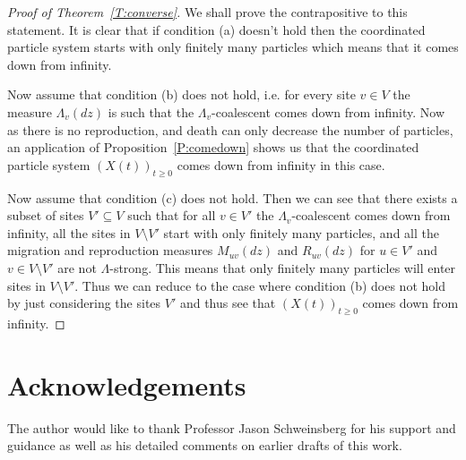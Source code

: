 \documentclass[11pt]{article}
\theoremstyle{definition}
\newcommand{\thmref}[1]{Theorem~\ref{T:#1}}
\newcommand{\propref}[1]{Proposition~\ref{P:#1}}
\begin{document}
\begin{proof}[Proof of \thmref{converse}]
    We shall prove the contrapositive to this statement. It is clear that if condition (a) doesn't hold then the coordinated particle system starts with only finitely many particles which means that it comes down from infinity. 
    \medskip
    
    \noindent Now assume that condition (b) does not hold, i.e. for every site $v \in V$ the measure $\Lambda_v(dz)$ is such that the $\Lambda_v$-coalescent comes down from infinity. Now as there is no reproduction, and death can only decrease the number of particles, an application of \propref{comedown} shows us that the coordinated particle system $(X(t))_{t \geq 0}$ comes down from infinity in this case. 
    \medskip
    
    \noindent Now assume that condition (c) does not hold. Then we can see that there exists a subset of sites $V' \subseteq V$ such that for all $v \in V'$ the $\Lambda_v$-coalescent comes down from infinity, all the sites in $V \setminus V'$ start with only finitely many particles, and all the migration and reproduction measures $M_{uv}(dz)$ and $R_{uv}(dz)$ for $u \in V'$ and $v \in V\setminus V'$ are not $\Lambda$-strong. This means that only finitely many particles will enter sites in $V \setminus V'$. Thus we can reduce to the case where condition (b) does not hold by just considering the sites $V'$ and thus see that $(X(t))_{t \geq 0}$ comes down from infinity.
\end{proof}

\section*{Acknowledgements}

The author would like to thank Professor Jason Schweinsberg for his support and guidance as well as his detailed comments on earlier drafts of this work.


\end{document}
